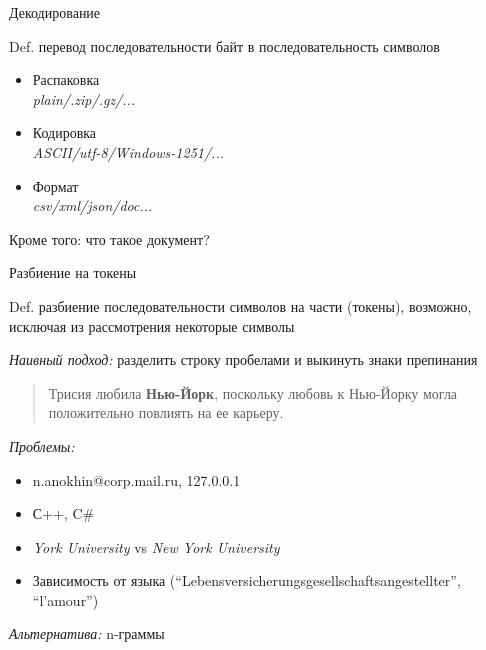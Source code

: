 \documentclass[10pt]{beamer}
\begin{document}
\begin{frame}{Декодирование}

\begin{block}{Def.}
перевод последовательности байт в последовательность символов
\end{block}

\begin{itemize}
\item Распаковка \\
{\it plain/.zip/.gz/...}
\item Кодировка \\
{\it ASCII/utf-8/Windows-1251/...}
\item Формат \\
{\it csv/xml/json/doc...}
\end{itemize}

Кроме того: что такое документ?

\end{frame}


\begin{frame}{Разбиение на токены}

\begin{block}{Def.}
разбиение последовательности символов на части (токены), возможно, исключая из рассмотрения некоторые символы
\end{block}

\vspace{1em}
{\it Наивный подход:} разделить строку пробелами и выкинуть знаки препинания
\begin{quote}
Трисия любила {\bf Нью-Йорк}, поскольку любовь к Нью-Йорку могла положительно повлиять на ее карьеру.
\end{quote}

{\it Проблемы:}
\begin{itemize}
\item n.anokhin@corp.mail.ru, 127.0.0.1
\item С++, C\#
\item {\it York University} vs {\it New York University}
\item Зависимость от языка (``Lebensversicherungsgesellschaftsangestellter'', ``l'amour'')
\end{itemize}

{\it Альтернатива:} n-граммы

\end{frame}

\end{document}
